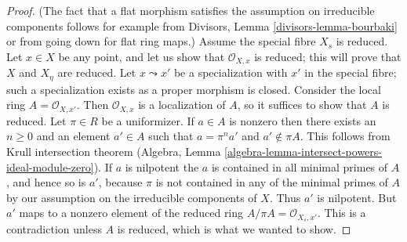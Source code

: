 \documentclass[10pt,a4paper]{amsart}
\theoremstyle{plain}
\theoremstyle{definition}
\theoremstyle{remark}
\numberwithin{equation}{subsection}
\begin{document}
\begin{proof}
(The fact that a flat morphism satisfies the assumption on irreducible
components follows for example from
Divisors, Lemma \ref{divisors-lemma-bourbaki}
or from going down for flat ring maps.)
Assume the special fibre $X_s$ is reduced.
Let $x \in X$ be any point, and let us show that $\mathcal{O}_{X, x}$
is reduced; this will prove that $X$ and $X_\eta$ are reduced.
Let $x \leadsto x'$ be a specialization with $x'$
in the special fibre; such a specialization exists
as a proper morphism is closed. Consider the local
ring $A = \mathcal{O}_{X, x'}$. Then $\mathcal{O}_{X, x}$
is a localization of $A$, so it suffices to show that
$A$ is reduced. Let $\pi \in R$ be a uniformizer.
If $a \in A$ is nonzero then there exists an $n \geq 0$ and an element
$a' \in A$ such that $a = \pi^n a'$ and $a' \not \in \pi A$.
This follows from Krull intersection theorem
(Algebra, Lemma \ref{algebra-lemma-intersect-powers-ideal-module-zero}).
If $a$ is nilpotent the $a$ is contained in all minimal primes of $A$,
and hence so is $a'$, because $\pi$ is not contained in any
of the minimal primes of $A$ by our assumption on the irreducible
components of $X$. Thus $a'$ is nilpotent.
But $a'$ maps to a nonzero element of the reduced ring
$A/\pi A = \mathcal{O}_{X_s, x'}$.
This is a contradiction unless $A$ is reduced, which
is what we wanted to show.
\end{proof}
\end{document}

